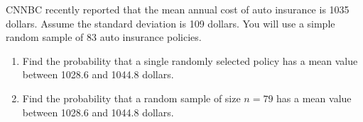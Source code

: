 \begin{exercise}

CNNBC recently reported that the mean annual cost of auto insurance is
1035 dollars. Assume the standard deviation is 109 dollars. You will use
a simple random sample of 83 auto insurance policies.

\begin{enumerate}
\item
  Find the probability that a single randomly selected policy has a mean
  value between 1028.6 and 1044.8 dollars.
\item
  Find the probability that a random sample of size \(n=79\) has a mean
  value between 1028.6 and 1044.8 dollars.
\end{enumerate}

\end{exercise}

